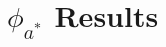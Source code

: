 \documentclass[11pt]{amsart}
\begin{document}
%
%
%
%

\newpage
\section{$\phi_{a^*}$ Results}




\newpage

\end{document}
